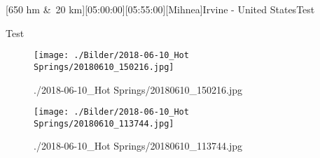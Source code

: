 \begin{minipage}{\textwidth}[650 hm \&~20 km][05:00:00][05:55:00][Mihnea]{Irvine - United States}\label{2018-06-10-Hot Springs}Test
















 Test














\end{minipage}\newline{}\begin{figure}\centering\texttt{[image: ./Bilder/2018-06-10\_Hot Springs/20180610\_150216.jpg]}\caption*{./2018-06-10\_Hot Springs/20180610\_150216.jpg}\end{figure}\begin{figure}\centering\texttt{[image: ./Bilder/2018-06-10\_Hot Springs/20180610\_113744.jpg]}\caption*{./2018-06-10\_Hot Springs/20180610\_113744.jpg}\end{figure}\vspace{2em} ~\newline 
